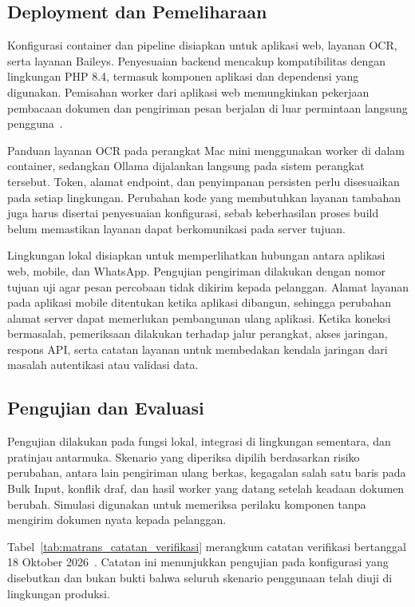 \subsection{Deployment dan Pemeliharaan}

Konfigurasi container dan pipeline disiapkan untuk aplikasi web, layanan OCR, serta layanan Baileys. Penyesuaian backend mencakup kompatibilitas dengan lingkungan PHP 8.4, termasuk komponen aplikasi dan dependensi yang digunakan. Pemisahan worker dari aplikasi web memungkinkan pekerjaan pembacaan dokumen dan pengiriman pesan berjalan di luar permintaan langsung pengguna~\cite{docker_doc, gitlab_cicd}.

Panduan layanan OCR pada perangkat Mac mini menggunakan worker di dalam container, sedangkan Ollama dijalankan langsung pada sistem perangkat tersebut. Token, alamat endpoint, dan penyimpanan persisten perlu disesuaikan pada setiap lingkungan. Perubahan kode yang membutuhkan layanan tambahan juga harus disertai penyesuaian konfigurasi, sebab keberhasilan proses build belum memastikan layanan dapat berkomunikasi pada server tujuan.

Lingkungan lokal disiapkan untuk memperlihatkan hubungan antara aplikasi web, mobile, dan WhatsApp. Pengujian pengiriman dilakukan dengan nomor tujuan uji agar pesan percobaan tidak dikirim kepada pelanggan. Alamat layanan pada aplikasi mobile ditentukan ketika aplikasi dibangun, sehingga perubahan alamat server dapat memerlukan pembangunan ulang aplikasi. Ketika koneksi bermasalah, pemeriksaan dilakukan terhadap jalur perangkat, akses jaringan, respons API, serta catatan layanan untuk membedakan kendala jaringan dari masalah autentikasi atau validasi data.

\subsection{Pengujian dan Evaluasi}

Pengujian dilakukan pada fungsi lokal, integrasi di lingkungan sementara, dan pratinjau antarmuka. Skenario yang diperiksa dipilih berdasarkan risiko perubahan, antara lain pengiriman ulang berkas, kegagalan salah satu baris pada Bulk Input, konflik draf, dan hasil worker yang datang setelah keadaan dokumen berubah. Simulasi digunakan untuk memeriksa perilaku komponen tanpa mengirim dokumen nyata kepada pelanggan.

Tabel~\ref{tab:matrans_catatan_verifikasi} merangkum catatan verifikasi bertanggal 18 Oktober 2026~\cite{matrans_verifikasi}. Catatan ini menunjukkan pengujian pada konfigurasi yang disebutkan dan bukan bukti bahwa seluruh skenario penggunaan telah diuji di lingkungan produksi.

